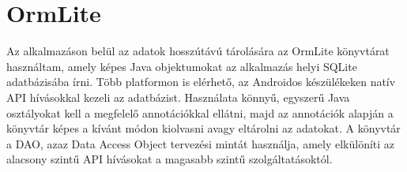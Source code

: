 \section*{OrmLite}
\label{ormlite}

Az alkalmazáson belül az adatok hosszútávú tárolására az OrmLite könyvtárat \cite{ormlite} használtam, amely képes Java objektumokat az alkalmazás helyi SQLite adatbázisába írni. 
Több platformon is elérhető, az Androidos készülékeken natív API hívásokkal kezeli az adatbázist. 
Használata könnyű, egyszerű Java osztályokat kell a megfelelő annotációkkal ellátni, majd az annotációk alapján a könyvtár képes a kívánt módon kiolvasni avagy eltárolni az adatokat. 
A könyvtár a DAO, azaz Data Access Object tervezési mintát használja, amely elkülöníti az alacsony szintű API hívásokat a magasabb szintű szolgáltatásoktól. 
